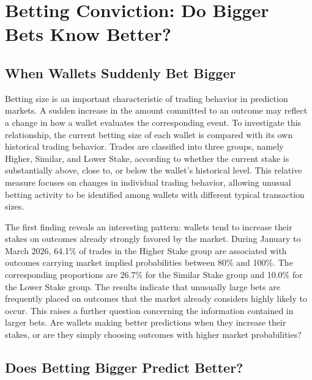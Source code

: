 \section{Betting Conviction: Do Bigger Bets Know Better?}\label{sec:conviction}

\subsection{When Wallets Suddenly Bet Bigger}

Betting size is an important characteristic of trading behavior in prediction markets. A sudden increase in the amount committed to an outcome may reflect a change in how a wallet evaluates the corresponding event. To investigate this relationship, the current betting size of each wallet is compared with its own historical trading behavior. Trades are classified into three groups, namely Higher, Similar, and Lower Stake, according to whether the current stake is substantially above, close to, or below the wallet's historical level. This relative measure focuses on changes in individual trading behavior, allowing unusual betting activity to be identified among wallets with different typical transaction sizes.

The first finding reveals an interesting pattern: wallets tend to increase their stakes on outcomes already strongly favored by the market. During January to March 2026, 64.1\% of trades in the Higher Stake group are associated with outcomes carrying market implied probabilities between 80\% and 100\%. The corresponding proportions are 26.7\% for the Similar Stake group and 10.0\% for the Lower Stake group. The results indicate that unusually large bets are frequently placed on outcomes that the market already considers highly likely to occur. This raises a further question concerning the information contained in larger bets. Are wallets making better predictions when they increase their stakes, or are they simply choosing outcomes with higher market probabilities?


\subsection{Does Betting Bigger Predict Better?}

